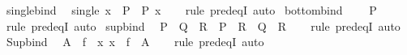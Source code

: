 \begin{isabellebody}
\isamarkupfalse%
\ single{\isacharunderscore}{\kern0pt}bind{\isacharcolon}{\kern0pt}\isanewline
\ \ {\isachardoublequoteopen}single\ x\ {\isasymbind}\ P\ {\isacharequal}{\kern0pt}\ P\ x{\isachardoublequoteclose}\isanewline
%
\isadelimproof
\ \ %
\endisadelimproof
%
\isatagproof
{}\isamarkupfalse%
\ {\isacharparenleft}{\kern0pt}rule\ pred{\isacharunderscore}{\kern0pt}eqI{\isacharparenright}{\kern0pt}\ auto%
\endisatagproof
{\isafoldproof}%
%
\isadelimproof
\isanewline
%
\endisadelimproof
\isanewline
{}\isamarkupfalse%
\ bottom{\isacharunderscore}{\kern0pt}bind{\isacharcolon}{\kern0pt}\isanewline
\ \ {\isachardoublequoteopen}{\isasymbottom}\ {\isasymbind}\ P\ {\isacharequal}{\kern0pt}\ {\isasymbottom}{\isachardoublequoteclose}\isanewline
%
\isadelimproof
\ \ %
\endisadelimproof
%
\isatagproof
{}\isamarkupfalse%
\ {\isacharparenleft}{\kern0pt}rule\ pred{\isacharunderscore}{\kern0pt}eqI{\isacharparenright}{\kern0pt}\ auto%
\endisatagproof
{\isafoldproof}%
%
\isadelimproof
\isanewline
%
\endisadelimproof
\isanewline
{}\isamarkupfalse%
\ sup{\isacharunderscore}{\kern0pt}bind{\isacharcolon}{\kern0pt}\isanewline
\ \ {\isachardoublequoteopen}{\isacharparenleft}{\kern0pt}P\ {\isasymsqunion}\ Q{\isacharparenright}{\kern0pt}\ {\isasymbind}\ R\ {\isacharequal}{\kern0pt}\ P\ {\isasymbind}\ R\ {\isasymsqunion}\ Q\ {\isasymbind}\ R{\isachardoublequoteclose}\isanewline
%
\isadelimproof
\ \ %
\endisadelimproof
%
\isatagproof
{}\isamarkupfalse%
\ {\isacharparenleft}{\kern0pt}rule\ pred{\isacharunderscore}{\kern0pt}eqI{\isacharparenright}{\kern0pt}\ auto%
\endisatagproof
{\isafoldproof}%
%
\isadelimproof
\isanewline
%
\endisadelimproof
\isanewline
{}\isamarkupfalse%
\ Sup{\isacharunderscore}{\kern0pt}bind{\isacharcolon}{\kern0pt}\isanewline
\ \ {\isachardoublequoteopen}{\isacharparenleft}{\kern0pt}{\isasymSqunion}A\ {\isasymbind}\ f{\isacharparenright}{\kern0pt}\ {\isacharequal}{\kern0pt}\ {\isasymSqunion}{\isacharparenleft}{\kern0pt}{\isacharparenleft}{\kern0pt}{\isasymlambda}x{\isachardot}{\kern0pt}\ x\ {\isasymbind}\ f{\isacharparenright}{\kern0pt}\ {\isacharbackquote}{\kern0pt}\ A{\isacharparenright}{\kern0pt}{\isachardoublequoteclose}\isanewline
%
\isadelimproof
\ \ %
\endisadelimproof
%
\isatagproof
{}\isamarkupfalse%
\ {\isacharparenleft}{\kern0pt}rule\ pred{\isacharunderscore}{\kern0pt}eqI{\isacharparenright}{\kern0pt}\ auto%
\endisatagproof
{\isafoldproof}%
%
\isadelimproof
\isanewline
%
\endisadelimproof
\isanewline
{}\isamarkupfalse%

\end{isabellebody}
